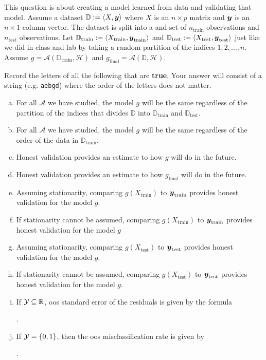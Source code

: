 \documentclass[12pt]{article}
\begin{document}
\problem [10min] This question is about creating a model learned from data and validating that model. Assume a dataset $\mathbb{D} := \left<X, \boldsymbol{y}\right>$ where $X$ is an $n \times p$ matrix and $\boldsymbol{y}$ is an $n \times 1$ column vector. The dataset is split into a  and  set of $n_{\text{train}}$ observations and $n_{\text{test}}$ observations. Let $\mathbb{D}_{\text{train}} := \left<X_{\text{train}}, \boldsymbol{y}_{\text{train}}\right>$ and $\mathbb{D}_{\text{test}} := \left<X_{\text{test}}, \boldsymbol{y}_{\text{test}}\right>$ just like we did in class and lab by taking a random partition of the indices $1, 2, \ldots, n$. Assume $g = \mathcal{A}(\mathbb{D}_{\text{train}}, \mathcal{H})$ and $ g_{\text{final}} = \mathcal{A}(\mathbb{D}, \mathcal{H})$.

\benum

 Record the letters of all the following that are \textbf{true}. Your answer will consist of a string (e.g. \texttt{aebgd}) where the order of the letters does not matter.

\begin{enumerate}[(a)]
\item For all $\mathcal{A}$ we have studied, the model $g$ will be the same regardless of the partition of the indices that divides $\mathbb{D}$ into $\mathbb{D}_{\text{train}}$ and $\mathbb{D}_{\text{test}}$.
\item For all $\mathcal{A}$ we have studied, the model $g$ will be the same regardless of the order of the data in $\mathbb{D}_{\text{train}}$.
\item Honest validation provides an estimate to how $g$ will do in the future.
\item Honest validation provides an estimate to how $g_{\text{final}}$ will do in the future.
\item Assuming stationarity, comparing $g(X_{\text{train}})$ to $\boldsymbol{y}_{\text{train}}$ provides honest validation for the model $g$.
\item If stationarity cannot be assumed, comparing $g(X_{\text{train}})$ to $\boldsymbol{y}_{\text{train}}$ provides honest validation for the model $g$
\item Assuming stationarity, comparing $g(X_{\text{test}})$ to $\boldsymbol{y}_{\text{test}}$ provides honest validation for the model $g$.
\item If stationarity cannot be assumed, comparing $g(X_{\text{test}})$ to $\boldsymbol{y}_{\text{test}}$ provides honest validation for the model $g$.
\item If $\mathcal{Y} \subseteq \mathbb{R}$, oos standard error of the residuals is given by the formula 

\beqn
{} .
\eeqn
\item If $\mathcal{Y} = \left\{0, 1\right\}$, then the oos misclassification rate is given by

\beqn
{} .
\eeqn
\end{enumerate}
\eenum\pagebreak
\end{document}
